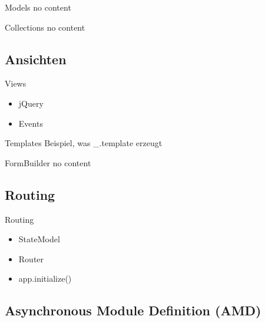 \begin{frame}{Models}
  no content
\end{frame}

\begin{frame}{Collections}
  no content
\end{frame}

\subsection{Ansichten}

\begin{frame}{Views}
  \begin{itemize}
    \item jQuery
    \item Events
  \end{itemize}
\end{frame}

\begin{frame}{Templates}
  Beispiel, was _.template erzeugt
\end{frame}

\begin{frame}{FormBuilder}
  no content
\end{frame}

\subsection{Routing}

\begin{frame}{Routing}
  \begin{itemize}
    \item StateModel
    \item Router
    \item app.initialize()
  \end{itemize}
\end{frame}

\subsection[AMD]{Asynchronous Module Definition (AMD)}


